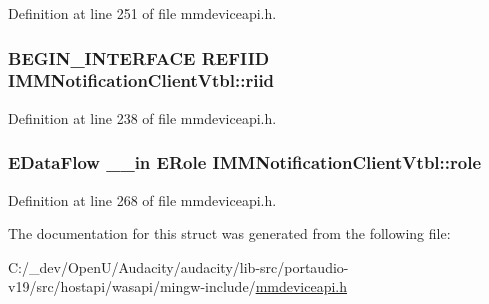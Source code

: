 Definition at line 251 of file mmdeviceapi.\+h.

\subsubsection[{\texorpdfstring{riid}{riid}}]{\setlength{\rightskip}{0pt plus 5cm}B\+E\+G\+I\+N\+\_\+\+I\+N\+T\+E\+R\+F\+A\+CE {\bf R\+E\+F\+I\+ID} I\+M\+M\+Notification\+Client\+Vtbl\+::riid}\hypertarget{struct_i_m_m_notification_client_vtbl_af2b3dcf1fb84fcc0873123eff8b87e36}{}\label{struct_i_m_m_notification_client_vtbl_af2b3dcf1fb84fcc0873123eff8b87e36}


Definition at line 238 of file mmdeviceapi.\+h.

\subsubsection[{\texorpdfstring{role}{role}}]{ {\bf E\+Data\+Flow} {\bf \+\_\+\+\_\+in} {\bf E\+Role} I\+M\+M\+Notification\+Client\+Vtbl\+::role}\hypertarget{struct_i_m_m_notification_client_vtbl_ac5e66caa511911fb3f6591755ef61975}{}\label{struct_i_m_m_notification_client_vtbl_ac5e66caa511911fb3f6591755ef61975}


Definition at line 268 of file mmdeviceapi.\+h.



The documentation for this struct was generated from the following file\+:\begin{DoxyCompactItemize}
\item 
C\+:/\+\_\+dev/\+Open\+U/\+Audacity/audacity/lib-\/src/portaudio-\/v19/src/hostapi/wasapi/mingw-\/include/\hyperlink{mmdeviceapi_8h}{mmdeviceapi.\+h}\end{DoxyCompactItemize}
